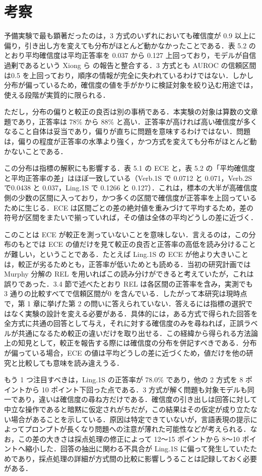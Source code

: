 \section{考察}

予備実験で最も顕著だったのは，3 方式のいずれにおいても確信度が 0.9 以上に偏り，引き出し方を変えても分布がほとんど動かなかったことである．表 5.2 のとおり平均確信度は平均正答率を 0.037 から 0.127 上回っており，モデルが自信過剰であるという Xiong ら \cite{xiong2024llmuncertainty} の報告と整合する．3 方式とも AUROC の信頼区間は0.5 を上回っており，順序の情報が完全に失われているわけではない．しかし分布が偏っているため，確信度の値を手がかりに検証対象を絞り込む用途では，使える段階が実質的に限られる．

ただし，分布の偏りと較正の良否は別の事柄である．本実験の対象は算数の文章題であり，正答率は 78\% から 88\% と高い．正答率が高ければ高い確信度が多くなること自体は妥当であり，偏りが直ちに問題を意味するわけではない．問題は，偏りの程度が正答率の水準より強く，かつ方式を変えても分布がほとんど動かないことである．

この分布は指標の解釈にも影響する．表 5.1 の ECE と，表 5.2 の「平均確信度と平均正答率の差」はほぼ一致している（Verb.1S で 0.0712 と 0.071，Verb.2S で0.0438 と 0.037，Ling.1S で 0.1266 と 0.127）．これは，標本の大半が高確信度側の少数の区間に入っており，かつ多くの区間で確信度が正答率を上回っているために生じる．ECE は区間ごとの差の絶対値を重みづけて平均するため，差の符号が区間をまたいで揃っていれば，その値は全体の平均どうしの差に近づく．

このことは ECE が較正を測っていないことを意味しない．言えるのは，この分布のもとでは ECE の値だけを見て較正の良否と正答率の高低を読み分けることが難しい，ということである．たとえば Ling.1S の ECE が他より大きいことは，較正が劣るためとも，正答率が低いためとも読める．当初の研究計画では Murphy 分解の REL を用いればこの読み分けができると考えていたが，これは誤りであった．3.4 節で述べたとおり REL は各区間の正答率を含み，実測でも 3 通りの比較すべてで信頼区間が0 を含んでいる．したがって本研究は現時点で，第 1 章に挙げた第 2 の問いに答えられていない．答えるには指標の選択ではなく実験の設計を変える必要がある．具体的には，ある方式で得られた回答を全方式に共通の回答として与え，それに対する確信度のみを尋ねれば，正誤ラベルが共通になるため較正の違いだけを取り出せる．この経緯から得られる方法論上の知見として，較正を報告する際には確信度の分布を併記すべきである．分布が偏っている場合，ECE の値は平均どうしの差に近づくため，値だけを他の研究と比較しても意味を読み違えうる．

もう 1 つ注目すべきは，Ling.1S の正答率が 78.0\% であり，他の 2 方式を 8 ポイントから 10 ポイント下回った点である．3 方式が解く問題も対象モデルも同一であり，違いは確信度の尋ね方だけである．確信度の引き出しは回答に対して中立な操作であると暗黙に仮定されがちだが，この結果はその仮定が成り立たない場合があることを示している．原因は特定できていないが，言語表現の提示によってプロンプトが長くなり問題への注意が薄れた可能性などが考えられる．なお，この差の大きさは採点処理の修正によって 12〜15 ポイントから 8〜10 ポイントへ縮小した．回答の抽出に関わる不具合が Ling.1S に偏って発生していたためであり，採点処理の詳細が方式間の比較に影響しうることは記録しておく必要がある．


